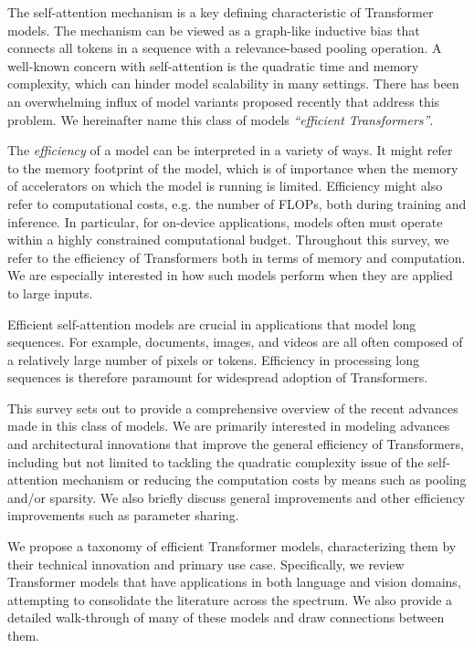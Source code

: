 The self-attention mechanism is a key defining characteristic of Transformer models. The mechanism can be viewed as a graph-like inductive bias that connects all tokens in a sequence with a relevance-based pooling operation. A well-known concern with self-attention is the quadratic time and memory complexity, which can hinder model scalability in many settings. There has been an overwhelming influx of model variants proposed recently that address this problem. We hereinafter name this class of models \textit{``efficient Transformers''}. 

The \emph{efficiency} of a model can be interpreted in a variety of ways. It might refer to the memory footprint of the model, which is of importance when the memory of accelerators on which the model is running is limited. Efficiency might also refer to computational costs, e.g. the number of FLOPs, both during training and inference. In particular, for on-device applications, models often must operate within a highly constrained computational budget. Throughout this survey, we refer to the efficiency of Transformers both in terms of memory and computation. We are especially interested in how such models perform when they are applied to large inputs.  

Efficient self-attention models are crucial in applications that model long sequences. For example, documents, images, and videos are all often composed of a relatively large number of pixels or tokens. Efficiency in processing long sequences is therefore paramount for widespread adoption of Transformers.

This survey sets out to provide a comprehensive overview of the recent advances made in this class of models. We are primarily interested in modeling advances and architectural innovations that improve the general efficiency of Transformers, including but not limited to tackling the quadratic complexity issue of the self-attention mechanism or reducing the computation costs by means such as pooling and/or sparsity. We also briefly discuss general improvements and other efficiency improvements such as parameter sharing.

We propose a taxonomy of efficient Transformer models, characterizing them by their technical innovation and primary use case. Specifically, we review Transformer models that have applications in both language and vision domains, attempting to consolidate the literature across the spectrum. We also provide a detailed walk-through of many of these models and draw connections between them.

